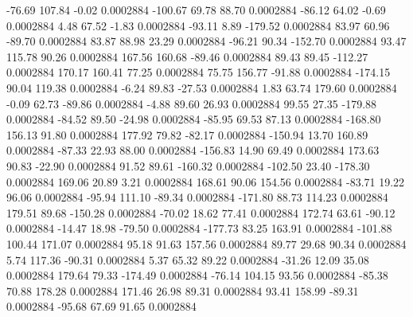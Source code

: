       -76.69      107.84       -0.02     0.0002884
     -100.67       69.78       88.70     0.0002884
      -86.12       64.02       -0.69     0.0002884
        4.48       67.52       -1.83     0.0002884
      -93.11        8.89     -179.52     0.0002884
       83.97       60.96      -89.70     0.0002884
       83.87       88.98       23.29     0.0002884
      -96.21       90.34     -152.70     0.0002884
       93.47      115.78       90.26     0.0002884
      167.56      160.68      -89.46     0.0002884
       89.43       89.45     -112.27     0.0002884
      170.17      160.41       77.25     0.0002884
       75.75      156.77      -91.88     0.0002884
     -174.15       90.04      119.38     0.0002884
       -6.24       89.83      -27.53     0.0002884
        1.83       63.74      179.60     0.0002884
       -0.09       62.73      -89.86     0.0002884
       -4.88       89.60       26.93     0.0002884
       99.55       27.35     -179.88     0.0002884
      -84.52       89.50      -24.98     0.0002884
      -85.95       69.53       87.13     0.0002884
     -168.80      156.13       91.80     0.0002884
      177.92       79.82      -82.17     0.0002884
     -150.94       13.70      160.89     0.0002884
      -87.33       22.93       88.00     0.0002884
     -156.83       14.90       69.49     0.0002884
      173.63       90.83      -22.90     0.0002884
       91.52       89.61     -160.32     0.0002884
     -102.50       23.40     -178.30     0.0002884
      169.06       20.89        3.21     0.0002884
      168.61       90.06      154.56     0.0002884
      -83.71       19.22       96.06     0.0002884
      -95.94      111.10      -89.34     0.0002884
     -171.80       88.73      114.23     0.0002884
      179.51       89.68     -150.28     0.0002884
      -70.02       18.62       77.41     0.0002884
      172.74       63.61      -90.12     0.0002884
      -14.47       18.98      -79.50     0.0002884
     -177.73       83.25      163.91     0.0002884
     -101.88      100.44      171.07     0.0002884
       95.18       91.63      157.56     0.0002884
       89.77       29.68       90.34     0.0002884
        5.74      117.36      -90.31     0.0002884
        5.37       65.32       89.22     0.0002884
      -31.26       12.09       35.08     0.0002884
      179.64       79.33     -174.49     0.0002884
      -76.14      104.15       93.56     0.0002884
      -85.38       70.88      178.28     0.0002884
      171.46       26.98       89.31     0.0002884
       93.41      158.99      -89.31     0.0002884
      -95.68       67.69       91.65     0.0002884
